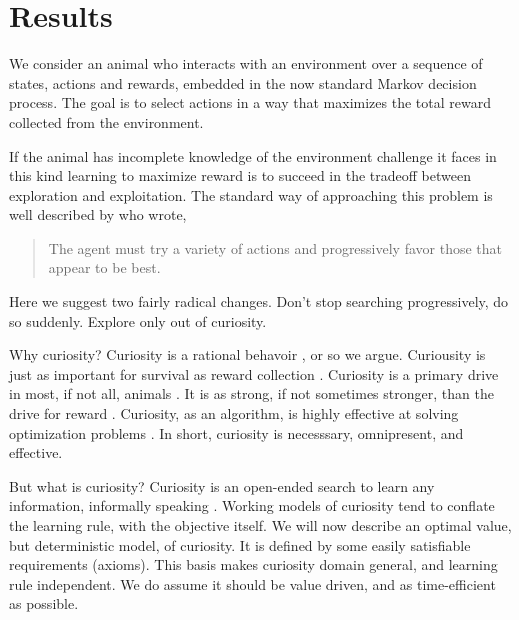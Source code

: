 \section{Results} 
We consider an animal who interacts with an environment over a sequence of states, actions and rewards, embedded in the now standard Markov decision process. The goal is to select actions in a way that maximizes the total reward collected from the environment. 


If the animal has incomplete knowledge of the environment challenge it faces in this kind learning to maximize reward is to succeed in the tradeoff between exploration and exploitation. The standard way of approaching this problem is well described by \cite{Sutton2018} who wrote,

\begin{quotation}
	The agent must try a variety of actions and progressively favor those that appear to be best. 	
\end{quotation}

Here we suggest two fairly radical changes. Don’t stop searching progressively, do so suddenly. Explore only out of curiosity. 

Why curiosity? Curiosity is a rational behavoir \cite{Rich2016a}, or so we argue. Curiousity is just as important for survival as reward collection \cite{Thrun1992}. Curiosity is a primary drive in most, if not all, animals \cite{Inglis2001}. It is as strong, if not sometimes stronger, than the drive for reward \cite{Loewenstein1994,Kidd2015,Gottlieb2018}. Curiosity, as an algorithm, is highly effective at solving optimization problems \cite{Schmidhuber1991,Pathak2017,Stanton2018,Lehman201,Mouret2011b1,Fister2019,Mouret2015,Colas2020,Cully2015,Pathak2017,Schwartenbeck2019.Laversanne-Finot2018}. In short, curiosity is necesssary, omnipresent, and effective.

But what is curiosity? Curiosity is an open-ended search to learn any information, informally speaking \citep{Kidd2015}. Working models of curiosity tend to conflate the learning rule, with the objective itself. We will now describe an optimal value, but deterministic model, of curiosity. It is defined by some easily satisfiable requirements (axioms). This basis makes curiosity domain general, and learning rule independent. We do assume it should be value driven, and as time-efficient as possible.


